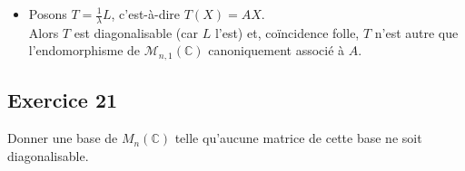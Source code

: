 \documentclass[a4paper,12pt]{article}
\begin{document}
\begin{enumerate}
\begin{correctionbox}
\begin{itemize}
                \item Posons \(T = \frac{1}{\lambda}L\), c'est-à-dire \(T(X) = AX\). \\
                Alors \(T\) est diagonalisable (car \(L\) l'est) et, coïncidence folle, \(T\) n'est autre que l'endomorphisme de \(\mathcal{M}_{n,1}(\mathbb{C})\) canoniquement associé à \(A\).\\
            \end{itemize}
        \end{correctionbox}
    \end{enumerate}



    \subsection*{Exercice 21}
    Donner une base de \( M_n(\mathbb{C}) \) telle qu'aucune matrice de cette base ne soit diagonalisable.
    
\end{document}
